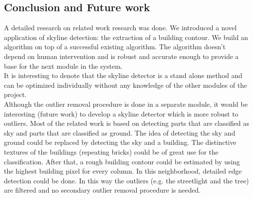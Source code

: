 

\subsection{Conclusion and Future work}
A detailed research on related work research was done.
We introduced a novel application of skyline detection: the extraction of a
building contour. We build an algorithm on top of a successful existing
algorithm.  The algorithm doesn't depend on human intervention and is robust and
accurate enough to provide a base for the next module in the system.\\
It is interesting to denote that the skyline detector is a stand alone method and
can be optimized individually without any knowledge of the other modules of the
project.\\

Although the outlier removal procedure is done in a separate module, it would be
interesting (future work) to develop a skyline detector which is more robust to
outliers.  Most of the related work is based on detecting parts that are
classified as sky and parts that are classified as ground. The idea of detecting
the sky and ground could be replaced by detecting the sky and a building. The
distinctive textures of the buildings (repeating bricks) could be of great use
for the classification.  After that, a rough building contour could be estimated
	by using the highest building pixel for every column. In this neighborhood,
	detailed edge detection could be done. In this way the outliers (e.g. the
	streetlight and the tree) are filtered and no secondary outlier removal
	procedure is needed.




